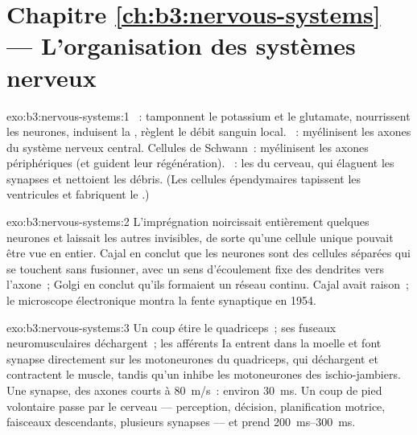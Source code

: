 \section*{Chapitre \ref{ch:b3:nervous-systems} --- L'organisation des systèmes nerveux}

\begin{solution}{exo:b3:nervous-systems:1}
~: tamponnent le potassium et le glutamate, nourrissent les
neurones, induisent la , règlent le débit
sanguin local. ~: myélinisent les axones du système
nerveux central. Cellules de Schwann~: myélinisent les axones
périphériques (et guident leur régénération). ~: les
 du cerveau, qui élaguent les synapses et nettoient les
débris. (Les cellules épendymaires tapissent les ventricules et
fabriquent le .)
\end{solution}

\begin{solution}{exo:b3:nervous-systems:2}
L'imprégnation noircissait entièrement quelques neurones et laissait les
autres invisibles, de sorte qu'une cellule unique pouvait être vue en
entier. Cajal en conclut que les neurones sont des cellules séparées qui
se touchent sans fusionner, avec un sens d'écoulement fixe des dendrites
vers l'axone~; Golgi en conclut qu'ils formaient un réseau continu.
Cajal avait raison~; le microscope électronique montra la fente
synaptique en 1954.
\end{solution}

\begin{solution}{exo:b3:nervous-systems:3}
Un coup étire le quadriceps~; ses fuseaux neuromusculaires déchargent~;
les afférents Ia entrent dans la moelle et font synapse directement sur
les motoneurones du quadriceps, qui déchargent et contractent le muscle,
tandis qu'un  inhibe les motoneurones des ischio-jambiers.
Une synapse, des axones courts à \qty{80}{m/s}~: environ \qty{30}{ms}.
Un coup de pied volontaire passe par le cerveau --- perception,
décision, planification motrice, faisceaux descendants, plusieurs
synapses --- et prend \qtyrange{200}{300}{ms}.
\end{solution}

